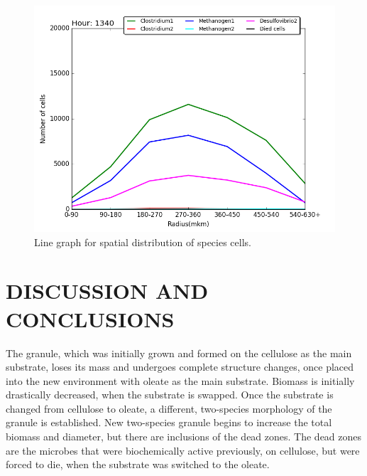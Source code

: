 \begin{figure}[htbp]
\centering
\includegraphics[width=1.0\textwidth]{images/spatial3.png}
\caption{Line graph for spatial distribution of species cells.}
\label{fig:spatial3}
\end{figure}

\chapter{DISCUSSION AND CONCLUSIONS}

The granule, which was initially grown and formed on the
cellulose as the main substrate, loses its mass and undergoes complete structure
changes, once placed into the new environment with oleate as the main substrate.
Biomass is initially drastically decreased, when the substrate is swapped. Once the
substrate is changed from cellulose to oleate, a different, two-species morphology of
the granule is established. New two-species granule begins to increase the total
biomass and diameter, but there are inclusions of the dead zones. The dead zones
are the microbes that were biochemically active previously, on cellulose, but were
forced to die, when the substrate was switched to the oleate.

